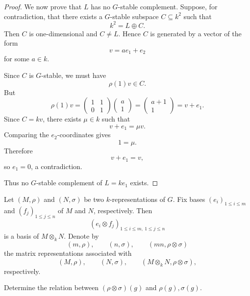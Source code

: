 \begin{proof}
    We now prove that \(L\) has no \(G\)-stable complement. Suppose, for contradiction,
    that there exists a \(G\)-stable subspace \(C\subseteq k^2\) such that
    \[
        k^2=L\oplus C.
    \]
    Then \(C\) is one-dimensional and \(C\neq L\). Hence \(C\) is generated by a vector
    of the form
    \[
        v=ae_1+e_2
    \]
    for some \(a\in k\).

    Since \(C\) is \(G\)-stable, we must have
    \[
        \rho(1)v\in C.
    \]
    But
    \[
        \rho(1)v
        =
        \begin{pmatrix}
            1 & 1\\
            0 & 1
        \end{pmatrix}
        \begin{pmatrix}
            a\\
            1
        \end{pmatrix}
        =
        \begin{pmatrix}
            a+1\\
            1
        \end{pmatrix}
        =
        v+e_1.
    \]
    Since \(C=kv\), there exists \(\mu\in k\) such that
    \[
        v+e_1=\mu v.
    \]
    Comparing the \(e_2\)-coordinates gives
    \[
        1=\mu.
    \]
    Therefore
    \[
        v+e_1=v,
    \]
    so \(e_1=0\), a contradiction.

    Thus no \(G\)-stable complement of \(L=ke_1\) exists.
\end{proof}

\begin{exercise}
    Let \((M,\rho)\) and \((N,\sigma)\) be two \(k\)-representations of \(G\).
    Fix bases \((e_i)_{1\leq i\leq m}\) and \((f_j)_{1\leq j\leq n}\) of \(M\) and \(N\),
    respectively. Then
    \[
        (e_i\otimes f_j)_{1\leq i\leq m,\ 1\leq j\leq n}
    \]
    is a basis of \(M\otimes_k N\). Denote by
    \[
        (m,\rho),\qquad (n,\sigma),\qquad (mn,\rho\otimes\sigma)
    \]
    the matrix representations associated with
    \[
        (M,\rho),\qquad (N,\sigma),\qquad (M\otimes_k N,\rho\otimes\sigma),
    \]
    respectively.

    Determine the relation between \((\rho\otimes\sigma)(g)\) and
    \(\rho(g),\sigma(g)\).
\end{exercise}

